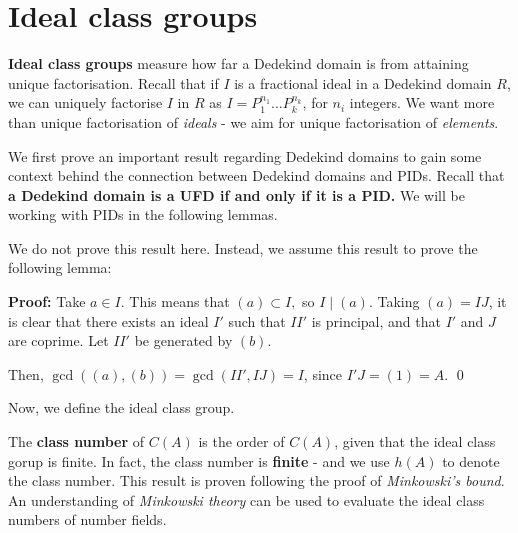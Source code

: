 \documentclass[a4paper, 12pt,oneside,openany]{book}
\begin{document}
\section{Ideal class groups}

\textbf{Ideal class groups} measure how far a Dedekind domain is from attaining unique factorisation. Recall that if $I$ is a fractional ideal in a Dedekind domain $R$, we can uniquely factorise $I$ in $R$ as $I=P_1^{n_1}\dots P_k^{n_k}$, for $n_i$ integers. We want more than unique factorisation of \emph{ideals} - we aim for unique factorisation of \emph{elements}. 

We first prove an important result regarding Dedekind domains to gain some context behind the connection between Dedekind domains and PIDs. Recall that \textbf{a Dedekind domain is a UFD if and only if it is a PID.} We will be working with PIDs in the following lemmas. 


We do not prove this result here. Instead, we assume this result to prove the following lemma:


\textbf{Proof:} Take $a \in I$. This means that $(a) \subset I,$ so $I \mid (a).$ Taking $(a)=IJ$, it is clear that there exists an ideal $I'$ such that $II'$ is principal, and that $I'$ and $J$ are coprime. Let $II'$ be generated by $(b).$ 

Then, $\gcd((a), (b)) = \gcd(II', IJ) = I$, since $I'J=(1)=A.$ \qed

Now, we define the ideal class group.


The \textbf{class number} of $C(A)$ is the order of $C(A)$, given that the ideal class gorup is finite. In fact, the class number is \textbf{finite} - and we use $h(A)$ to denote the class number. This result is proven following the proof of \emph{Minkowski's bound}. An understanding of \emph{Minkowski theory} can be used to evaluate the ideal class numbers of number fields.
\end{document}
